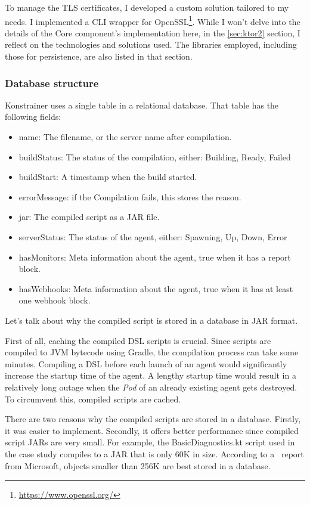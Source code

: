 To manage the TLS certificates, I developed a custom solution tailored to my needs. I implemented a CLI wrapper for OpenSSL\footnote{\url{https://www.openssl.org/}}. While I won't delve into the details of the Core component's implementation here, in the \ref{sec:ktor2} section, I reflect on the technologies and solutions used. The libraries employed, including those for persistence, are also listed in that section.

\subsubsection{Database structure}

Konstrainer uses a single table in a relational database. That table has the following fields:

\begin{itemize}
    \item name: The filename, or the server name after compilation.
    \item buildStatus: The status of the compilation, either: Building, Ready, Failed
    \item buildStart: A timestamp when the build started.
    \item errorMessage: if the Compilation fails, this stores the reason.
    \item jar: The compiled script as a JAR file.
    \item serverStatus: The status of the agent, either: Spawning, Up, Down, Error
    \item hasMonitors: Meta information about the agent, true when it has a report block.
    \item hasWebhooks: Meta information about the agent, true when it has at least one webhook block.
\end{itemize}

Let's talk about why the compiled script is stored in a database in JAR format.

First of all, caching the compiled DSL scripts is crucial. Since scripts are compiled to JVM bytecode using Gradle, the compilation process can take some minutes. Compiling a DSL before each launch of an agent would significantly increase the startup time of the agent. A lengthy startup time would result in a relatively long outage when the \emph{Pod} of an already existing agent gets destroyed. To circumvent this, compiled scripts are cached.

There are two reasons why the compiled scripts are stored in a database. Firstly, it was easier to implement. Secondly, it offers better performance since compiled script JARs are very small. For example, the BasicDiagnostics.kt script used in the case study compiles to a JAR that is only 60K in size. According to a~\cite{DbSmall} report from Microsoft, objects smaller than 256K are best stored in a database.

